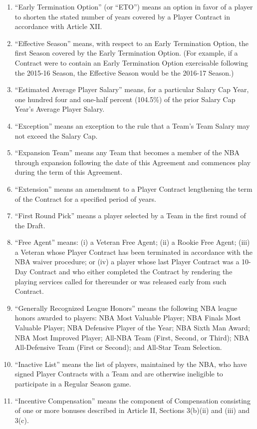 \documentclass[
]{book}
\begin{document}
\begin{enumerate}
\item
  ``Early Termination Option'' (or ``ETO'') means an option in favor of a player to shorten the stated number of years covered by a Player Contract in accordance with Article XII.
\item
  ``Effective Season'' means, with respect to an Early Termination Option, the first Season covered by the Early Termination Option. (For example, if a Contract were to contain an Early Termination Option exercisable following the 2015-16 Season, the Effective Season would be the 2016-17 Season.)
\item
  ``Estimated Average Player Salary'' means, for a particular Salary Cap Year, one hundred four and one-half percent (104.5\%) of the prior Salary Cap Year's Average Player Salary.
\item
  ``Exception'' means an exception to the rule that a Team's Team Salary may not exceed the Salary Cap.
\item
  ``Expansion Team'' means any Team that becomes a member of the NBA through expansion following the date of this Agreement and commences play during the term of this Agreement.
\item
  ``Extension'' means an amendment to a Player Contract lengthening the term of the Contract for a specified period of years.
\item
  ``First Round Pick'' means a player selected by a Team in the first round of the Draft.
\item
  ``Free Agent'' means: (i) a Veteran Free Agent; (ii) a Rookie Free Agent; (iii) a Veteran whose Player Contract has been terminated in accordance with the NBA waiver procedure; or (iv) a player whose last Player Contract was a 10-Day Contract and who either completed the Contract by rendering the playing services called for thereunder or was released early from such Contract.
\item
  ``Generally Recognized League Honors'' means the following NBA league honors awarded to players: NBA Most Valuable Player; NBA Finals Most Valuable Player; NBA Defensive Player of the Year; NBA Sixth Man Award; NBA Most Improved Player; All-NBA Team (First, Second, or Third); NBA All-Defensive Team (First or Second); and All-Star Team Selection.
\item
  ``Inactive List'' means the list of players, maintained by the NBA, who have signed Player Contracts with a Team and are otherwise ineligible to participate in a Regular Season game.
\item
  ``Incentive Compensation'' means the component of Compensation consisting of one or more bonuses described in Article II, Sections 3(b)(ii) and (iii) and 3(c).

\end{enumerate}
\end{document}
